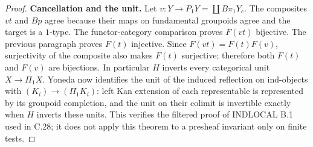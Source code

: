 \begin{proof}
\textbf{Cancellation and the unit.} Let $v:Y\to P_1Y=\coprod B\pi_1Y_c$.
The composites $vt$ and $Bp$ agree because their maps on fundamental
groupoids agree and the target is a $1$-type. The functor-category
comparison proves $F(vt)$ bijective. The previous paragraph proves
$F(t)$ injective. Since $F(vt)=F(t)F(v)$, surjectivity of the composite
also makes $F(t)$ surjective; therefore both $F(t)$ and $F(v)$ are
bijections. In particular $H$ inverts every categorical unit
$X\to\Pi_1X$. Yoneda now identifies the unit of the induced reflection
on ind-objects with $(K_i)\to(\Pi_1K_i)$: left Kan extension of each
representable is represented by its groupoid completion, and the unit
on their colimit is invertible exactly when $H$ inverts these units.
This verifies the filtered proof of INDLOCAL B.1 used in C.28; it does
not apply this theorem to a presheaf invariant only on finite tests.
\end{proof}

